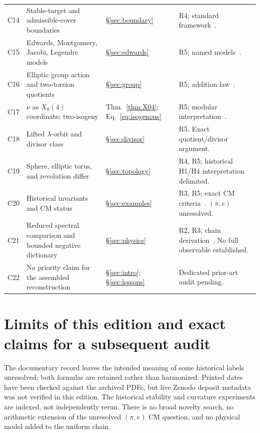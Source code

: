 \begin{longtable}{L{13mm}L{48mm}L{39mm}L{45mm}}
C14 & Stable-target and admissible-cover boundaries & \S\ref{sec:boundary} & R4; standard framework~\cite{Braungardt,CMR}.\\
C15 & Edwards, Montgomery, Jacobi, Legendre models & \S\ref{sec:edwards} & R5; named models~\cite{Edwards,Morain,EFD}.\\
C16 & Elliptic group action and two-torsion quotients & \S\ref{sec:group} & R5; addition law~\cite{EFD}.\\
C17 & \(\nu\) as \(X_0(4)\) coordinate; two-isogeny & Thm.~\ref{thm:X04}; Eq.~\eqref{eq:isogenous} & R5; modular interpretation~\cite{Sutherland,Morain}.\\
C18 & Lifted \(\lambda\)-orbit and divisor class & \S\ref{sec:divisor} & R5. Exact quotient/divisor argument.\\
C19 & Sphere, elliptic torus, and revolution differ & \S\ref{sec:topology} & R4, R5; historical H1/H4 interpretation delimited.\\
C20 & Historical invariants and CM status & \S\ref{sec:examples} & R3, R5; exact CM criteria~\cite{DLR}. \((\pi,e)\) unresolved.\\
C21 & Reduced spectral comparison and bounded negative dictionary & \S\ref{sec:physics} & R2, R3; chain derivation~\cite{Tong}. No full observable established.\\
C22 & No priority claim for the assembled reconstruction & \S\ref{sec:intro}; \S\ref{sec:lessons} & Dedicated prior-art audit pending.\\
\bottomrule
\end{longtable}

\section{Limits of this edition and exact claims for a subsequent audit}\label{app:audit}

The documentary record leaves the intended meaning of some historical labels unresolved; both formulas are retained rather than harmonized. Printed dates have been checked against the archived PDFs, but live Zenodo deposit metadata was not verified in this edition. The historical stability and curvature experiments are indexed, not independently rerun. There is no broad novelty search, no arithmetic extension of the unresolved \((\pi,e)\) CM question, and no physical model added to the uniform chain.

